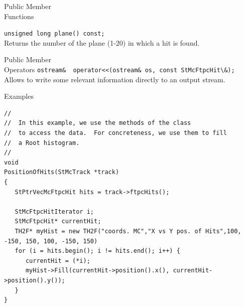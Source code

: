 \begin{Entry}
\item[Public Member\\ Functions]

    \verb+unsigned long plane() const;+\\
    Returns the number of the plane (1-20) in which a hit is found. 

\item[Public Member\\ Operators]
    \verb+ostream&  operator<<(ostream& os, const StMcFtpcHit\&);+\\
    Allows to write some relevant information directly to an output
    stream.

\item[Examples]
{\footnotesize
\begin{verbatim}
//
//  In this example, we use the methods of the class
//  to access the data.  For concreteness, we use them to fill
//  a Root histogram. 
//  
void
PositionOfHits(StMcTrack *track)
{
   StPtrVecMcFtpcHit hits = track->ftpcHits();

   StMcFtpcHitIterator i;
   StMcFtpcHit* currentHit;
   TH2F* myHist = new TH2F("coords. MC","X vs Y pos. of Hits",100, -150, 150, 100, -150, 150)
   for (i = hits.begin(); i != hits.end(); i++) {
      currentHit = (*i);
      myHist->Fill(currentHit->position().x(), currentHit->position().y());
   }
}
\end{verbatim}
}%
\end{Entry}

\clearpage
%
%
